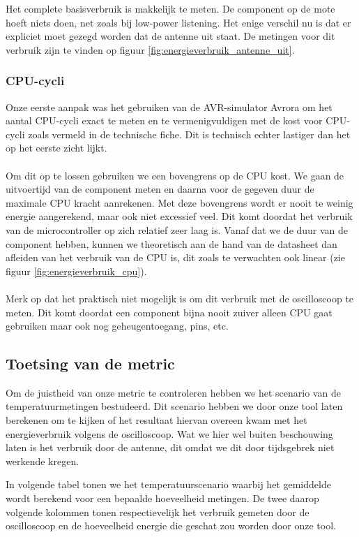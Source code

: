 \documentclass[11pt]{article}
\begin{document}
Het complete basisverbruik is makkelijk te meten. De component op de mote hoeft
niets doen, net zoals bij low-power listening. Het enige verschil nu is dat er
expliciet moet gezegd worden dat de antenne uit staat.
De metingen voor dit verbruik zijn te vinden op figuur \ref{fig:energieverbruik_antenne_uit}.

\subsubsection{CPU-cycli}

Onze eerste aanpak was het gebruiken van de AVR-simulator Avrora
\cite{titzer2005avrora} om het aantal CPU-cycli exact te meten en te
vermenigvuldigen met de kost voor CPU-cycli zoals vermeld in de technische
fiche. Dit is technisch echter lastiger dan het op het eerste zicht lijkt.
\\
\\
Om dit op te lossen gebruiken we een bovengrens op de CPU kost. We gaan de
uitvoertijd van de component meten en daarna voor de gegeven duur de maximale
CPU kracht aanrekenen. Met deze bovengrens wordt er nooit te weinig energie
aangerekend, maar ook niet excessief veel. Dit komt doordat het verbruik van de
microcontroller op zich relatief zeer laag is. Vanaf dat we de duur van de
component hebben, kunnen we theoretisch aan de hand van de datasheet dan afleiden
van het verbruik van de CPU is, dit zoals te verwachten ook linear (zie figuur
\ref{fig:energieverbruik_cpu}).\\
\\
Merk op dat het praktisch niet mogelijk is om dit verbruik met de oscilloscoop te meten.
Dit komt doordat een component bijna nooit zuiver alleen CPU gaat gebruiken maar ook nog geheugentoegang, pins, etc. 

\subsection{Toetsing van de metric}

Om de juistheid van onze metric te controleren hebben we het scenario van de
temperatuurmetingen bestudeerd. Dit scenario hebben we door onze tool laten
berekenen om te kijken of het resultaat hiervan overeen kwam met het
energieverbruik volgens de oscilloscoop. Wat we hier wel buiten beschouwing
laten is het verbruik door de antenne, dit omdat we dit door tijdsgebrek niet werkende kregen.

In volgende tabel tonen we het temperatuurscenario waarbij het gemiddelde wordt
berekend voor een bepaalde hoeveelheid metingen. De twee daarop volgende
kolommen tonen respectievelijk het verbruik gemeten door de oscilloscoop en de
hoeveelheid energie die geschat zou worden door onze tool.
\end{document}
